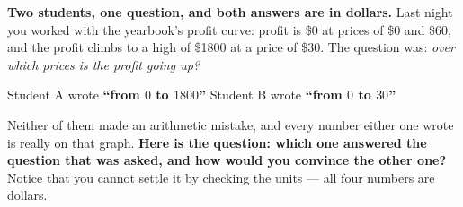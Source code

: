 \documentclass[10pt]{article}
\begin{document}
\vspace{0.10in}

\boxguard[12]
\begin{hookbox}
\small
\textbf{Two students, one question, and both answers are in dollars.} Last night you worked with the
yearbook's profit curve: profit is \$0 at prices of \$0 and \$60, and the profit climbs to a high of
\$1800 at a price of \$30. The question was: \emph{over which prices is the profit going up?}

\smallskip
Student A wrote \quad \textbf{``from $0$ to $1800$''} \qquad Student B wrote \quad
\textbf{``from $0$ to $30$''}

\smallskip
Neither of them made an arithmetic mistake, and every number either one wrote is really on that
graph. \textbf{Here is the question: which one answered the question that was asked, and how would
you convince the other one?} Notice that you cannot settle it by checking the units --- all four
numbers are dollars.

\\
\\
\end{hookbox}

\vspace{0.10in}
\end{document}
